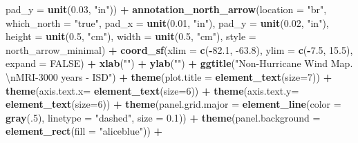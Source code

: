 \documentclass[12pt,twoside]{reedthesis}
\newenvironment{Shaded}{\begin{snugshade}}{\end{snugshade}}
\newcommand{\CharTok}[1]{\textcolor[rgb]{0.31,0.60,0.02}{#1}}
\newcommand{\DataTypeTok}[1]{\textcolor[rgb]{0.13,0.29,0.53}{#1}}
\newcommand{\DecValTok}[1]{\textcolor[rgb]{0.00,0.00,0.81}{#1}}
\newcommand{\FloatTok}[1]{\textcolor[rgb]{0.00,0.00,0.81}{#1}}
\newcommand{\KeywordTok}[1]{\textcolor[rgb]{0.13,0.29,0.53}{\textbf{#1}}}
\newcommand{\NormalTok}[1]{#1}
\newcommand{\OperatorTok}[1]{\textcolor[rgb]{0.81,0.36,0.00}{\textbf{#1}}}
\newcommand{\OtherTok}[1]{\textcolor[rgb]{0.56,0.35,0.01}{#1}}
\newcommand{\StringTok}[1]{\textcolor[rgb]{0.31,0.60,0.02}{#1}}
\begin{document}
\begin{Shaded}
\begin{Highlighting}[]
   \DataTypeTok{pad_y =} \KeywordTok{unit}\NormalTok{(}\FloatTok{0.03}\NormalTok{, }\StringTok{"in"}\NormalTok{)) }\OperatorTok{+}\StringTok{ }
\StringTok{  }\KeywordTok{annotation_north_arrow}\NormalTok{(}\DataTypeTok{location =} \StringTok{"br"}\NormalTok{, }\DataTypeTok{which_north =} \StringTok{"true"}\NormalTok{, }\DataTypeTok{pad_x =} \KeywordTok{unit}\NormalTok{(}\FloatTok{0.01}\NormalTok{, }\StringTok{"in"}\NormalTok{), }\DataTypeTok{pad_y =} \KeywordTok{unit}\NormalTok{(}\FloatTok{0.02}\NormalTok{, }\StringTok{"in"}\NormalTok{), }\DataTypeTok{height =} \KeywordTok{unit}\NormalTok{(}\FloatTok{0.5}\NormalTok{, }\StringTok{"cm"}\NormalTok{), }
   \DataTypeTok{width =} \KeywordTok{unit}\NormalTok{(}\FloatTok{0.5}\NormalTok{, }\StringTok{"cm"}\NormalTok{), }\DataTypeTok{style =}\NormalTok{ north_arrow_minimal) }\OperatorTok{+}
\StringTok{  }\KeywordTok{coord_sf}\NormalTok{(}\DataTypeTok{xlim =} \KeywordTok{c}\NormalTok{(}\OperatorTok{-}\FloatTok{82.1}\NormalTok{, }\FloatTok{-63.8}\NormalTok{), }\DataTypeTok{ylim =} \KeywordTok{c}\NormalTok{(}\OperatorTok{-}\FloatTok{7.5}\NormalTok{, }\FloatTok{15.5}\NormalTok{), }\DataTypeTok{expand =} \OtherTok{FALSE}\NormalTok{) }\OperatorTok{+}
\StringTok{  }\KeywordTok{xlab}\NormalTok{(}\StringTok{""}\NormalTok{) }\OperatorTok{+}\StringTok{ }
\StringTok{  }\KeywordTok{ylab}\NormalTok{(}\StringTok{""}\NormalTok{) }\OperatorTok{+}\StringTok{ }
\StringTok{  }\KeywordTok{ggtitle}\NormalTok{(}\StringTok{"Non-Hurricane Wind Map. }\CharTok{\textbackslash{}n}\StringTok{MRI-3000 years - ISD"}\NormalTok{) }\OperatorTok{+}\StringTok{ }
\StringTok{  }\KeywordTok{theme}\NormalTok{(}\DataTypeTok{plot.title =} \KeywordTok{element_text}\NormalTok{(}\DataTypeTok{size=}\DecValTok{7}\NormalTok{)) }\OperatorTok{+}
\StringTok{  }\KeywordTok{theme}\NormalTok{(}\DataTypeTok{axis.text.x=} \KeywordTok{element_text}\NormalTok{(}\DataTypeTok{size=}\DecValTok{6}\NormalTok{)) }\OperatorTok{+}\StringTok{ }
\StringTok{  }\KeywordTok{theme}\NormalTok{(}\DataTypeTok{axis.text.y=} \KeywordTok{element_text}\NormalTok{(}\DataTypeTok{size=}\DecValTok{6}\NormalTok{)) }\OperatorTok{+}
\StringTok{  }\KeywordTok{theme}\NormalTok{(}\DataTypeTok{panel.grid.major =} \KeywordTok{element_line}\NormalTok{(}\DataTypeTok{color =} \KeywordTok{gray}\NormalTok{(.}\DecValTok{5}\NormalTok{), }\DataTypeTok{linetype =} \StringTok{"dashed"}\NormalTok{, }\DataTypeTok{size =} \FloatTok{0.1}\NormalTok{)) }\OperatorTok{+}
\StringTok{  }\KeywordTok{theme}\NormalTok{(}\DataTypeTok{panel.background =} \KeywordTok{element_rect}\NormalTok{(}\DataTypeTok{fill =} \StringTok{"aliceblue"}\NormalTok{)) }\OperatorTok{+}

\end{Highlighting}
\end{Shaded}
\end{document}
